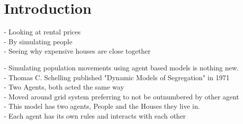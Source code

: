\section{Introduction}

\par
- Looking at rental prices \\
- By simulating people \\
- Seeing why expensive houses are close together \\

\par
- Simulating population movements using agent based models is nothing new. \\
- Thomas C. Schelling published "Dynamic Models of Segregation" in 1971 \\
  - Two Agents, both acted the same way \\
  - Moved around grid system preferring to not be outnumbered by other agent \\
- This model has two agents, People and the Houses they live in. \\
- Each agent has its own rules and interacts with each other \\

